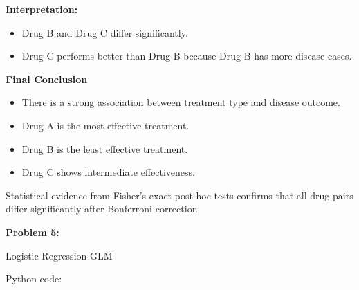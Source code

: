 \documentclass[
]{article}
\begin{document}
\textbf{Interpretation:}

\begin{itemize}
\item
  Drug B and Drug C differ significantly.
\item
  Drug C performs better than Drug B because Drug B has more disease
  cases.
\end{itemize}

\textbf{Final Conclusion}

\begin{itemize}
\item
  There is a strong association between treatment type and disease
  outcome.
\item
  Drug A is the most effective treatment.
\item
  Drug B is the least effective treatment.
\item
  Drug C shows intermediate effectiveness.
\end{itemize}

Statistical evidence from Fisher's exact post-hoc tests confirms that
all drug pairs differ significantly after Bonferroni correction

\textbf{\ul{Problem 5:}}

Logistic Regression GLM

Python code:
\end{document}
